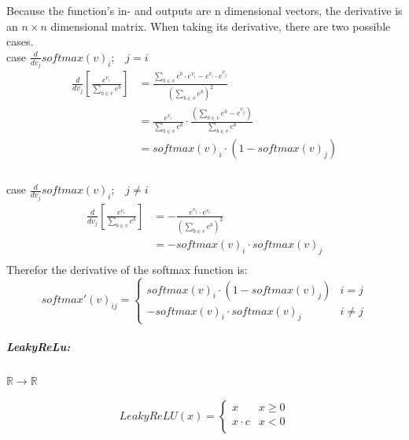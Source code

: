 \documentclass[12pt]{article}
\begin{document}
Because the function's in- and outputs are n dimensional vectors, the derivative is an \(n\times n\) dimensional matrix. When taking its derivative, there are two possible cases. 
\\\indent case \(\frac{d}{dv_j}softmax(v)_i\);~~\(j = i\)
\begin{align*}
\frac{d}{dv_j}\left[\frac{e^{v_i}}{\sum_{b\in v} e^{b}}\right]
&= \frac{\sum_{b \in v}e^b \cdot e^{v_i}-e^{v_i}\cdot e^{v_j}}{(\sum_{b \in v}e^b)^2}\\
&= \frac{e^{v_i}}{\sum_{b\in v}e^b}\cdot \frac{\left(\sum_{b \in v} e^b - e^{v_j}\right)}{\sum_{b \in v} e^b}\\
&= softmax(v)_i\cdot (1 - softmax(v)_j)\\
\end{align*}
\\\indent case \(\frac{d}{dv_j}softmax(v)_i\);~~\(j \neq i\)
\begin{align*}
\frac{d}{dv_j}\left[\frac{e^{v_i}}{\sum_{b\in v} e^{b}}\right] 
&= -\frac{e^{v_j}\cdot e^{v_i}}{\left(\sum_{b \in v}e^b\right)^2} \\
&= -softmax(v)_i\cdot softmax(v)_j \\
\end{align*}
Therefor the derivative of the softmax function is:
\begin{equation}\label{eq:NN:softmax_derivative}
softmax'(v)_{ij} = \left\{
\begin{array}{ll}
 softmax(v)_i\cdot (1-softmax(v)_j) & i = j\\
 - softmax(v)_i \cdot softmax(v)_j     & i \neq j
\end{array}
\right.
\end{equation}
\subparagraph{LeakyReLu:}\(\mathbb{R} \to \mathbb{R}\)
\begin{center}

\end{center}
\begin{equation} \label{eq:NN:ReLU}
LeakyReLU(x) = \left\{
\begin{array}{ll}
x & x \ge 0 \\
x \cdot c & x < 0 \\
\end{array}
\right.
\end{equation}
\end{document}
